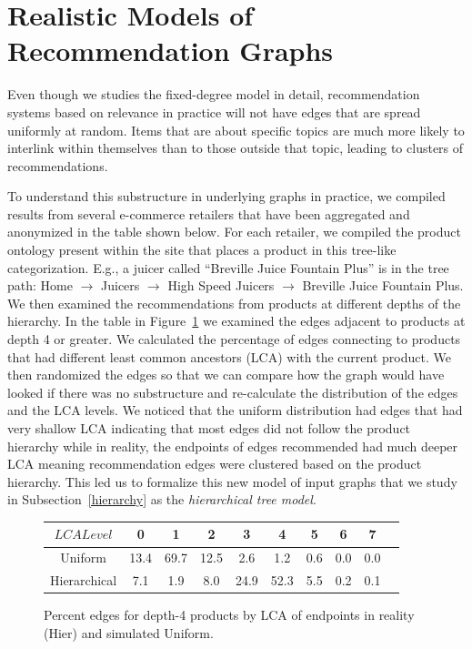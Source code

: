 \section{Realistic Models of Recommendation Graphs}
Even though we studies the fixed-degree model in detail, recommendation systems based on relevance in practice
will not have edges that are spread uniformly at random. Items that are
about specific topics are much more likely to interlink within
themselves than to those outside that topic, leading to
clusters of recommendations.

To understand this substructure in underlying
graphs in practice, we compiled results from several e-commerce retailers that
have been aggregated and anonymized in the table shown below. For each
retailer, we compiled the product ontology present within the
site that places a product in this tree-like categorization. E.g., a
juicer called ``Breville Juice Fountain Plus'' is in the tree path:
Home $\rightarrow$ Juicers $\rightarrow$ High Speed Juicers
$\rightarrow$ Breville Juice Fountain Plus. We then examined the
recommendations from products at different depths of the hierarchy. In
the table in Figure~\ref{fig:hier} we examined the edges adjacent to
products at depth 4 or greater. We calculated the percentage of edges
connecting to products that had different least common ancestors (LCA) with the current product.  We
then randomized the edges so that we can compare how the graph would
have looked if there was no substructure and re-calculate the
distribution of the edges and the LCA levels. We noticed that the
uniform distribution had edges that had very shallow LCA indicating that
most edges did not follow the product hierarchy while in reality,
the endpoints of edges recommended had much deeper LCA meaning recommendation edges were clustered based on the product hierarchy. This led us
to formalize this new model of input graphs that we study in Subsection~\ref{hierarchy}
as the {\em hierarchical tree model}.

\begin{figure}[h]
  \centering
  \begin{tabular}{ |c|c|c|c|c|c|c|c|c|c| }
    \hline
    $LCA Level$ & 0 & 1 & 2 & 3 & 4 & 5 & 6 & 7 \\ \hline
    Uniform & 13.4 & 69.7 & 12.5 & 2.6 & 1.2 & 0.6 & 0.0 & 0.0 \\ \hline
    Hierarchical & 7.1 & 1.9 & 8.0 & 24.9 & 52.3 & 5.5 & 0.2 & 0.1\\
    \hline
  \end{tabular}
  \caption{Percent edges for depth-4 products by LCA of endpoints in reality (Hier) and simulated Uniform.}\label{fig:hier}
\end{figure}

